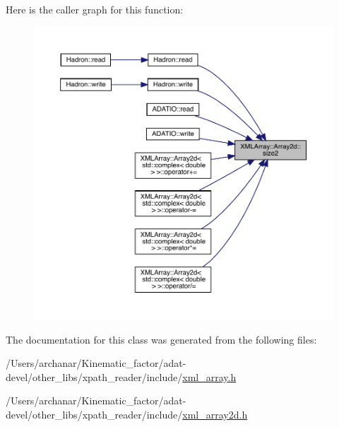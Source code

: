 Here is the caller graph for this function\+:
\nopagebreak
\begin{figure}[H]
\begin{center}
\leavevmode
\includegraphics[width=350pt]{dc/ddc/classXMLArray_1_1Array2d_a76f5ee9f75435c61089021f8cfbb6bf8_icgraph}
\end{center}
\end{figure}


The documentation for this class was generated from the following files\+:\begin{DoxyCompactItemize}
\item 
/\+Users/archanar/\+Kinematic\+\_\+factor/adat-\/devel/other\+\_\+libs/xpath\+\_\+reader/include/\mbox{\hyperlink{adat-devel_2other__libs_2xpath__reader_2include_2xml__array_8h}{xml\+\_\+array.\+h}}\item 
/\+Users/archanar/\+Kinematic\+\_\+factor/adat-\/devel/other\+\_\+libs/xpath\+\_\+reader/include/\mbox{\hyperlink{adat-devel_2other__libs_2xpath__reader_2include_2xml__array2d_8h}{xml\+\_\+array2d.\+h}}\end{DoxyCompactItemize}
